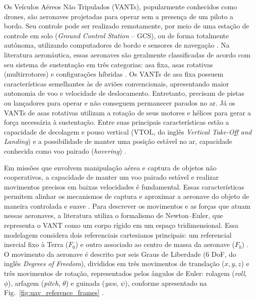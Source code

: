 

Os Veículos Aéreos Não Tripulados (VANTs), popularmente conhecidos como drones, são aeronaves projetadas para operar sem a presença de um piloto a bordo. Seu controle pode ser realizado remotamente, por meio de uma estação de controle em solo (\textit{Ground Control Station} -- GCS), ou de forma totalmente autônoma, utilizando computadores de bordo e sensores de navegação \cite{bonyan2018}. Na literatura aeronáutica, essas aeronaves são geralmente classificadas de acordo com seu sistema de sustentação em três categorias: asa fixa, asas rotativas (multirrotores) e configurações híbridas \cite{carvajal2024}. Os VANTs de asa fixa possuem características semelhantes às de aviões convencionais, apresentando maior autonomia de voo e velocidade de deslocamento. Entretanto, precisam de pistas ou lançadores para operar e não conseguem permanecer parados no ar. Já os VANTs de asas rotativas utilizam a rotação de seus motores e hélices para gerar a força necessária à sustentação. Entre suas principais características estão a capacidade de decolagem e pouso vertical (VTOL, do inglês \textit{Vertical Take-Off and Landing}) e a possibilidade de manter uma posição estável no ar, capacidade conhecida como voo pairado (\textit{hovering}) \cite{cocuzza2021}.

Em missões que envolvem manipulação aérea e captura de objetos não cooperativos, a capacidade de manter um voo pairado estável e realizar movimentos precisos em baixas velocidades é fundamental. Essas características permitem alinhar os mecanismos de captura e aproximar a aeronave do objeto de maneira controlada e suave \cite{cocuzza2021, meng2020, bonyan2018}. Para descrever os movimentos e as forças que atuam nessas aeronaves, a literatura utiliza o formalismo de Newton--Euler, que representa o VANT como um corpo rígido em um espaço tridimensional. Essa modelagem considera dois referenciais cartesianos principais: um referencial inercial fixo à Terra ($F_0$) e outro associado ao centro de massa da aeronave ($F_b$) \cite{adriansyah2017}. O movimento da aeronave é descrito por seis Graus de Liberdade (6 DoF, do inglês \textit{Degrees of Freedom}), divididos em três movimentos de translação ($x, y, z$) e três movimentos de rotação, representados pelos ângulos de Euler: rolagem (\textit{roll}, $\phi$), arfagem (\textit{pitch}, $\theta$) e guinada (\textit{yaw}, $\psi$), conforme apresentado na Fig.~\ref{fig:uav_reference_frames} \cite{sciortino2018}.

